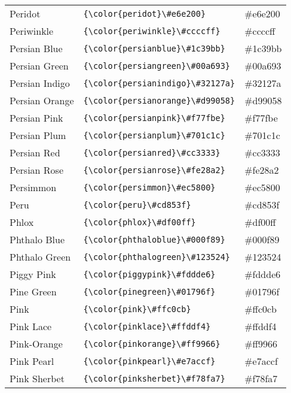 \documentclass[9.5pt]{article}
\begin{document}
\begin{longtable}{l | l | l}
	Peridot & \verb!{\color{peridot}\#e6e200}! & {\color{peridot}\#e6e200}\\
	Periwinkle & \verb!{\color{periwinkle}\#ccccff}! & {\color{periwinkle}\#ccccff}\\
	Persian Blue & \verb!{\color{persianblue}\#1c39bb}! & {\color{persianblue}\#1c39bb}\\
	Persian Green & \verb!{\color{persiangreen}\#00a693}! & {\color{persiangreen}\#00a693}\\
	Persian Indigo & \verb!{\color{persianindigo}\#32127a}! & {\color{persianindigo}\#32127a}\\
	Persian Orange & \verb!{\color{persianorange}\#d99058}! & {\color{persianorange}\#d99058}\\
	Persian Pink & \verb!{\color{persianpink}\#f77fbe}! & {\color{persianpink}\#f77fbe}\\
	Persian Plum & \verb!{\color{persianplum}\#701c1c}! & {\color{persianplum}\#701c1c}\\
	Persian Red & \verb!{\color{persianred}\#cc3333}! & {\color{persianred}\#cc3333}\\
	Persian Rose & \verb!{\color{persianrose}\#fe28a2}! & {\color{persianrose}\#fe28a2}\\
	Persimmon & \verb!{\color{persimmon}\#ec5800}! & {\color{persimmon}\#ec5800}\\
	Peru & \verb!{\color{peru}\#cd853f}! & {\color{peru}\#cd853f}\\
	Phlox & \verb!{\color{phlox}\#df00ff}! & {\color{phlox}\#df00ff}\\
	Phthalo Blue & \verb!{\color{phthaloblue}\#000f89}! & {\color{phthaloblue}\#000f89}\\
	Phthalo Green & \verb!{\color{phthalogreen}\#123524}! & {\color{phthalogreen}\#123524}\\
	Piggy Pink & \verb!{\color{piggypink}\#fddde6}! & {\color{piggypink}\#fddde6}\\
	Pine Green & \verb!{\color{pinegreen}\#01796f}! & {\color{pinegreen}\#01796f}\\
	Pink & \verb!{\color{pink}\#ffc0cb}! & {\color{pink}\#ffc0cb}\\
	Pink Lace & \verb!{\color{pinklace}\#ffddf4}! & {\color{pinklace}\#ffddf4}\\
	Pink-Orange & \verb!{\color{pinkorange}\#ff9966}! & {\color{pinkorange}\#ff9966}\\
	Pink Pearl & \verb!{\color{pinkpearl}\#e7accf}! & {\color{pinkpearl}\#e7accf}\\
	Pink Sherbet & \verb!{\color{pinksherbet}\#f78fa7}! & {\color{pinksherbet}\#f78fa7}\\

\end{longtable}
\end{document}
